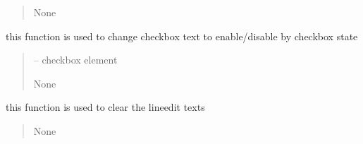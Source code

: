 \documentclass[letterpaper,10pt,english]{sphinxmanual}
\begin{document}
\begin{savenotes}
\begin{fulllineitems}
\begin{savenotes}
\begin{fulllineitems}
\begin{quote}
\begin{description}
\begin{itemize}
\end{itemize}

\sphinxAtStartPar
None

\end{description}\end{quote}

\end{fulllineitems}\end{savenotes}


\begin{savenotes}\begin{fulllineitems}
\label{\detokenize{setting/setting_UI:oxin.setting_UI.UI_main_window.check_box_state}}
\pysigstartsignatures
{}
\pysigstopsignatures
\sphinxAtStartPar
this function is used to change checkbox text to enable/disable by checkbox state
\begin{quote}\begin{description}
\sphinxAtStartPar
{} – checkbox element

\sphinxAtStartPar
None

\end{description}\end{quote}

\end{fulllineitems}\end{savenotes}


\begin{savenotes}\begin{fulllineitems}
\label{\detokenize{setting/setting_UI:oxin.setting_UI.UI_main_window.clear_line_edits}}
\pysigstartsignatures
{}
\pysigstopsignatures
\sphinxAtStartPar
this function is used to clear the lineedit texts
\begin{quote}\begin{description}
\sphinxAtStartPar
None


\end{description}
\end{quote}
\end{fulllineitems}
\end{savenotes}
\end{fulllineitems}
\end{savenotes}
\end{document}
